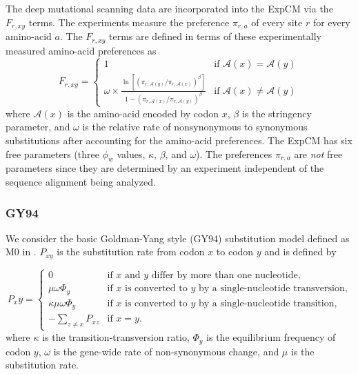 \documentclass[11pt]{article}
\begin{document}
The deep mutational scanning data are incorporated into the ExpCM via the $F_{r,xy}$ terms.
The experiments measure the preference $\pi_{r,a}$ of every site $r$ for every amino-acid $a$.
The $F_{r,xy}$ terms are defined in terms of these experimentally measured amino-acid preferences as
\begin{equation}
\label{eq:Frxy}
F_{r,xy} = 
\begin{cases}
   1 & \mbox{if $\mathcal{A}\left(x\right) = \mathcal{A}\left(y\right)$} \\
   \omega \times \frac{\ln\left[\left(\pi_{r,\mathcal{A}\left(y\right)} / \pi_{r,\mathcal{A}\left(x\right)}\right)^{\beta}\right]}{1 - \left(\pi_{r,\mathcal{A}\left(x\right)} / \pi_{r,\mathcal{A}\left(y\right)}\right)^{\beta}} & \mbox{if $\mathcal{A}\left(x\right) \ne \mathcal{A}\left(y\right)$}
   \end{cases}
\end{equation}
where $\mathcal{A}\left(x\right)$ is the amino-acid encoded by codon $x$, $\beta$ is the stringency parameter, and $\omega$ is the relative rate of nonsynonymous to synonymous substitutions after accounting for the amino-acid preferences.
The ExpCM has six free parameters (three $\phi_w$ values, $\kappa$, $\beta$, and $\omega$).
The preferences $\pi_{r,a}$ are \emph{not} free parameters since they are determined by an experiment independent of the sequence alignment being analyzed.

\subsubsection*{GY94}

We consider the basic Goldman-Yang style (GY94) substitution model defined as M0 in \citet{yang2000codon}. 
$P_{xy}$ is the substitution rate from codon $x$ to codon $y$ and is defined by

\begin{equation}
\label{eq:GY94}
P_xy = 
\begin{cases}
  0 & \mbox{if $x$ and $y$ differ by more than one nucleotide,}\\
  \mu \omega \Phi_{y} & \mbox{if $x$ is converted to $y$ by a single-nucleotide transversion,} \\
  \kappa \mu \omega \Phi_{y} & \mbox{if $x$ is converted to $y$ by a single-nucleotide transition,} \\
  -\sum\limits_{z \ne x} P_{xz} & \mbox{if $x = y$.}
  \end{cases}
\end{equation}
where $\kappa$ is the transition-transversion ratio, $\Phi_y$ is the equilibrium frequency of
codon $y$, $\omega$ is the gene-wide rate of non-synonymous change, and $\mu$ is the substitution rate.
\end{document}
